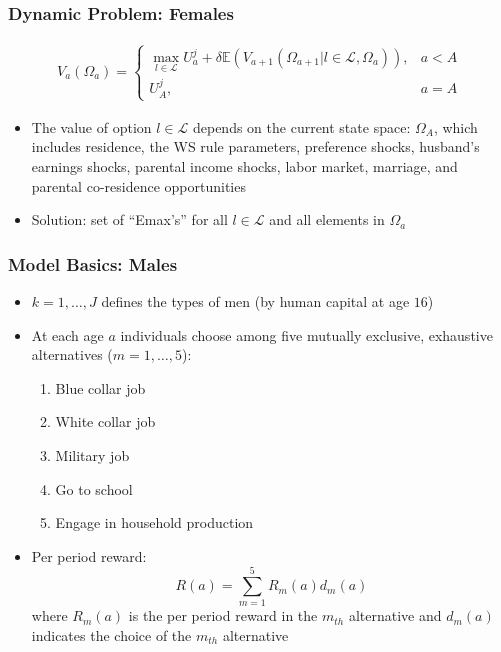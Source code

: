 \begin{frame}
	\frametitle{Dynamic Problem: Females}
	\begin{eqnarray}
		V_{a} (\Omega_{a}) = 
		\begin{cases}	
			\max_{l \in \mathcal{L}} {U_{a}^j + \delta \mathbb{E} \left(  V_{a+1}(\Omega_{a+1} | l \in \mathcal{L}, \Omega_{a}) \right) }, & a < A \nonumber \\
			U_{A}^j, & a = A \nonumber
		\end{cases}  
	\end{eqnarray}
	\begin{itemize}
		\item The value of option $l \in \mathcal{L}$ depends on the current state space: $\Omega_{A}$, which includes residence, the WS rule parameters, preference shocks, husband's earnings shocks, parental income shocks, labor market, marriage, and parental co-residence opportunities
		\item Solution: set of ``Emax's'' for all $l \in \mathcal{L}$ and all elements in $\Omega_{a}$ 
	\end{itemize}
\end{frame}

\begin{frame}
	\frametitle{Model Basics: Males}
	\begin{itemize}
		\item $k = 1, \ldots, J$ defines the types of men (by human capital at age $16$)
		\item At each age $a$ individuals choose among five mutually exclusive, exhaustive alternatives ($m = 1, \ldots, 5$):
		\begin{enumerate}
			\item Blue collar job
			\item White collar job
			\item Military job
			\item Go to school
			\item Engage in household production
		\end{enumerate}
		\item Per period reward:
		\begin{equation}
			R(a) = \sum \limits _{m=1} ^ 5 R_{m}(a)d_{m}(a) \nonumber
		\end{equation}
		\noindent where $R_{m}(a)$ is the per period reward in the $m_{th}$ alternative and $d_{m}(a)$ indicates the choice of the $m_{th}$ alternative 
	\end{itemize}
\end{frame}

